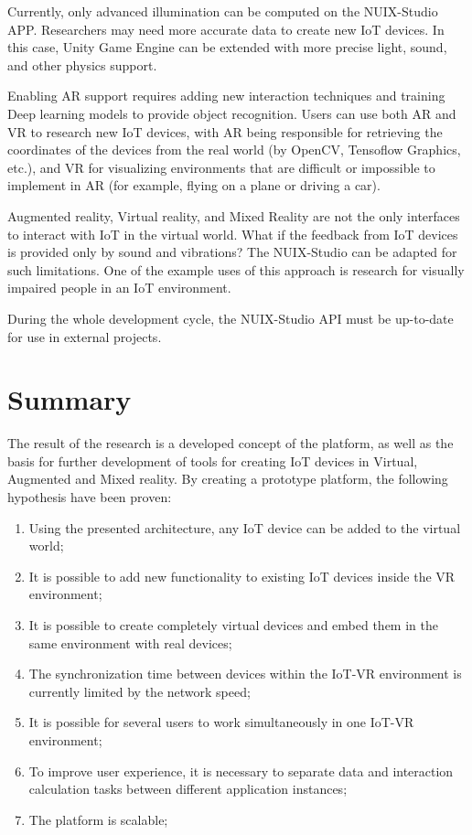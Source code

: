 Currently, only advanced illumination can be computed on the NUIX-Studio APP. Researchers may need more accurate data to create new IoT devices. In this case, Unity Game Engine can be extended with more precise light, sound, and other physics support.

Enabling AR support requires adding new interaction techniques and training Deep learning models to provide object recognition. Users can use both AR and VR to research new IoT devices, with AR being responsible for retrieving the coordinates of the devices from the real world (by OpenCV, Tensoflow Graphics, etc.), and VR for visualizing environments that are difficult or impossible to implement in AR (for example, flying on a plane or driving a car).

Augmented reality, Virtual reality, and Mixed Reality are not the only interfaces to interact with IoT in the virtual world. What if the feedback from IoT devices is provided only by sound and vibrations? The NUIX-Studio can be adapted for such limitations. One of the example uses of this approach is research for visually impaired people in an IoT environment.

During the whole development cycle, the NUIX-Studio API must be up-to-date for use in external projects. 

\section{Summary}


The result of the research is a developed concept of the platform, as well as the basis for further development of tools for creating IoT devices in Virtual, Augmented and Mixed reality. By creating a prototype platform, the following hypothesis have been proven:

\begin{enumerate}
    \item Using the presented architecture, any IoT device can be added to the virtual world;
    \item It is possible to add new functionality to existing IoT devices inside the VR environment;
    \item It is possible to create completely virtual devices and embed them in the same environment with real devices;
    \item The synchronization time between devices within the IoT-VR environment is currently limited by the network speed;
    \item It is possible for several users to work simultaneously in one IoT-VR environment;
    \item To improve user experience, it is necessary to separate data and interaction calculation tasks between different application instances;
    \item The platform is scalable;
\end{enumerate}


